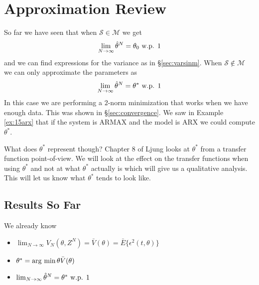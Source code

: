 
\mainmatter
\setcounter{page}{1}

\lectureseries[\course]{\course}

\date{November 19, 2009}

\setaddress

\setcounter{lecture}{15}
\setcounter{chapter}{15}


\section{Approximation Review}
So far we have seen that when $\mathcal{S}\in\mathcal{M}$ we get
$$\lim_{N\to\infty}\hat{\theta}^N=\theta_0 \text{ w.p. } 1$$
and we can find expressions for the variance as in \S\ref{sec:varsinm}. When $\mathcal{S}\notin\mathcal{M}$ we can only approximate the parameters as
$$\lim_{N\to\infty}\hat{\theta}^N=\theta^\ast \text{ w.p. } 1$$
In this case we are performing a $2$-norm minimization that works when we have enough data. This was shown in \S\ref{sec:convergence}. We saw in Example \ref{ex:15arx} that if the system is ARMAX and the model is ARX we could compute $\theta^\ast$.

What does $\theta^\ast$ represent though? Chapter 8 of Ljung looks at $\theta^\ast$ from a transfer function point-of-view. We will look at the effect on the transfer functions when using $\theta^\ast$ and not at what $\theta^\ast$ actually is which will give us a qualitative analysis. This will let us know what $\theta^\ast$ tends to look like.

\subsection{Results So Far}
We already know
\begin{itemize}
\item $\lim_{N\to\infty}V_N(\theta,Z^N) = \bar{V}(\theta) = \bar{E}\{\epsilon^2(t,\theta)\}$
\item $\theta^\ast = \mathop{\arg\,\min}\limits{\theta}\bar{V}(\theta)$
\item $\lim_{N\to\infty}\hat{\theta}^N = \theta^\ast \text{ w.p. } 1$
\end{itemize}


